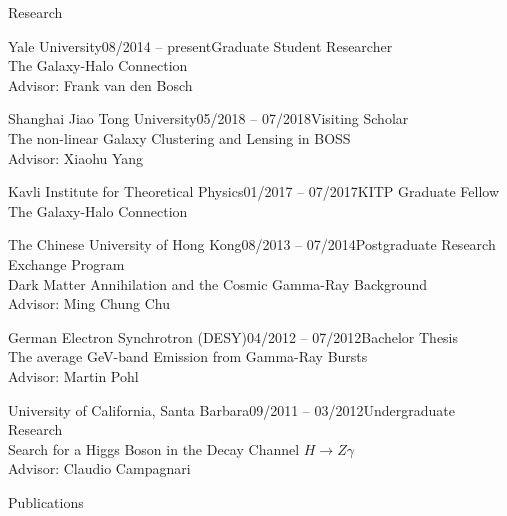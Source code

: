 \documentclass[11pt]{resume} %
\begin{document}
\begin{rSection}{Research}
  \begin{adjustwidth}{0.5cm}{}
    \begin{rSubsection}{Yale University}{08/2014 -- present}{Graduate Student Researcher\\The Galaxy-Halo Connection\\Advisor: Frank van den Bosch}{}\end{rSubsection}
    \begin{rSubsection}{Shanghai Jiao Tong University}{05/2018 -- 07/2018}{Visiting Scholar\\The non-linear Galaxy Clustering and Lensing in BOSS\\Advisor: Xiaohu Yang}{}\end{rSubsection}
    \begin{rSubsection}{Kavli Institute for Theoretical Physics}{01/2017 -- 07/2017}{KITP Graduate Fellow\\The Galaxy-Halo Connection}{}\end{rSubsection}
    \begin{rSubsection}{The Chinese University of Hong Kong}{08/2013 -- 07/2014}{Postgraduate Research Exchange Program\\Dark Matter Annihilation and the Cosmic Gamma-Ray Background\\Advisor: Ming Chung Chu}{}\end{rSubsection}
    \begin{rSubsection}{German Electron Synchrotron (DESY)}{04/2012 -- 07/2012}{Bachelor Thesis\\The average GeV-band Emission from Gamma-Ray Bursts\\Advisor: Martin Pohl}{}\end{rSubsection}
    \begin{rSubsection}{University of California, Santa Barbara}{09/2011 -- 03/2012}{Undergraduate Research\\Search for a Higgs Boson in the Decay Channel $H \rightarrow Z\gamma$\\Advisor: Claudio Campagnari}{}\end{rSubsection}
  \end{adjustwidth}
\end{rSection}

\begin{rSection}{Publications}
  \setlength{\leftskip}{0.5cm}
  \nocite{10, 9, 8, 7, 6, 5, 4, 3, 2, 1}
  \printbibliography[heading=none]
\end{rSection}
\end{document}
